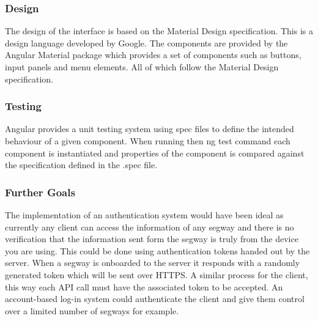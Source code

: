 \subsubsection*{Design}
The design of the interface is based on the Material Design specification. This is a design language developed by Google. The components are provided by the Angular Material package which 
provides a set of components such as buttons, input panels and menu elements. All of which follow the Material Design specification.~\cite{ref:angular_material}


\subsubsection*{Testing}
Angular provides a unit testing system using spec files to define the intended behaviour of a given component. When running then ng test command each component is instantiated and properties of the component is compared against the specification defined in the .spec file.

\subsubsection*{Further Goals}
The implementation of an authentication system would have been ideal 
as currently any client can access the information of any segway and
there is no verification that the information sent form the segway is
truly from the device you are using. This could be done using authentication tokens
handed out by the server. When a segway is onboarded to the server
it responds with a randomly generated token which will be sent 
over HTTPS. A similar process for the client, this way each API
call must have the associated token to be accepted. 
An account-based log-in system could authenticate the client 
and give them control over a limited number of segways for example.